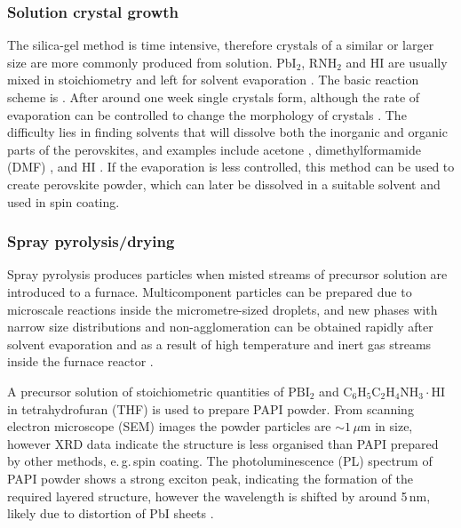 \subsubsection{Solution crystal growth}
\label{sec:solutiongrowth}
The silica-gel method is time intensive, therefore crystals of a similar or larger size are more commonly produced from solution. Pb$\textrm{I}_2$, R$\textrm{NH}_2$ and HI are usually mixed in stoichiometry and left for solvent evaporation \cite{Kitazawa1996, Tang2001, Ishihara1994}. The basic reaction scheme is . After around one week single crystals form, although the rate of evaporation can be controlled to change the morphology of crystals \cite{Cheng2010}. The difficulty lies in finding solvents that will dissolve both the inorganic and organic parts of the perovskites, and examples include acetone \cite{Hong1992}, dimethylformamide (DMF) \cite{Kitazawa1996}, and HI \cite{Barman2003}. If the evaporation is less controlled, this method can be used to create perovskite powder, which can later be dissolved in a suitable solvent and used in spin coating.

\subsubsection {Spray pyrolysis/drying}
Spray pyrolysis produces particles when misted streams of precursor solution are introduced to a furnace. Multicomponent particles can be prepared due to microscale reactions inside the micrometre-sized droplets, and new phases with narrow size distributions and non-agglomeration can be obtained rapidly after solvent evaporation and as a result of high temperature and inert gas streams inside the furnace reactor \cite{Cheng2005}. 

A precursor solution of stoichiometric quantities of $\textrm{PBI}_2$ and $\textrm{C}_6\textrm{H}_5\textrm{C}_2\textrm{H}_4\textrm{NH}_3\cdot\textrm{HI}$ in tetrahydrofuran (THF) is used to prepare PAPI powder. From scanning electron microscope (SEM) images the powder particles are $\sim 1\, \mu$m in size, however XRD data indicate the structure is less organised than PAPI prepared by other methods, e.\,g.\,spin coating. The photoluminescence (PL) spectrum of PAPI powder shows a strong exciton peak, indicating the formation of the required layered structure, however the wavelength is shifted by around 5\,nm, likely due to distortion of PbI sheets \cite{Cheng2005}.

